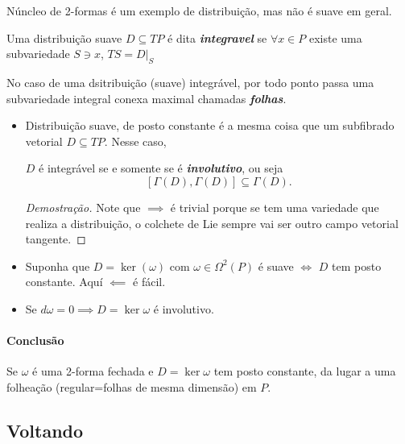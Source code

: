 \begin{example}
	N\'uncleo de 2-formas \'e um exemplo de distribui\c c\~ao, mas n\~ao \'e suave em geral.
\end{example}

\begin{defn}
	Uma distribui\c c\~ao suave $D\subseteq TP$ \'e dita \textit{\textbf{integravel}} se $\forall x\in P$ existe uma subvariedade $S\ni x$,  $TS=D|_{S}$
\end{defn}

No caso de uma dsitribui\c c\~ao (suave) integr\'avel, por todo ponto passa uma subvariedade integral conexa maximal chamadas \textit{\textbf{folhas}}.

\begin{remark}\leavevmode 
	\begin{itemize}
		\item Distribui\c c\~ao suave, de posto constante \'e a mesma coisa que um subfibrado vetorial $D\subseteq TP$. Nesse caso,

		\begin{thm}[Frobenius]
			$D$ \'e integr\'avel se e somente se \'e \textit{\textbf{involutivo}}, ou seja  \[[\Gamma(D),\Gamma(D)]\subseteq \Gamma(D).\]
		\end{thm}

		\begin{proof}[Demostra\c c\~ao]
			Note que $\implies $ \'e trivial porque se tem uma  variedade que realiza a distribui\c c\~ao, o colchete de Lie sempre vai ser outro campo vetorial tangente.
		\end{proof}
		
	\item Suponha que $D=\ker(\omega)$ com $\omega\in\Omega^2(P)$ \'e suave  $\iff$ $D$ tem posto constante. Aqu\'i $\impliedby$ \'e f\'acil.

	\item Se $d\omega=0 \implies D=\ker \omega$ \'e involutivo.
	\end{itemize}
\end{remark}

\paragraph{Conclus\~ao}  Se $\omega$ \'e uma 2-forma fechada e $D=\ker \omega$ tem posto constante, da lugar a uma folhea\c c\~ao (regular=folhas de mesma dimens\~ao) em $P$.


\subsection{Voltando}


